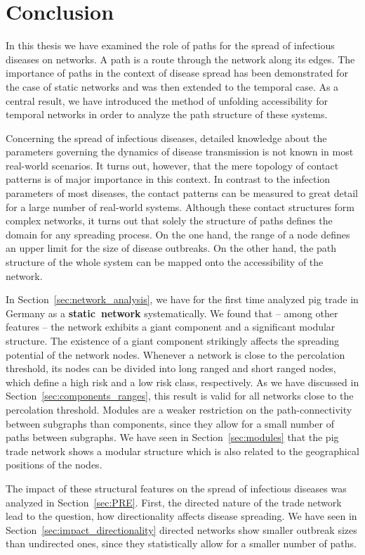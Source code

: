 \chapter{Conclusion}
In this thesis we have examined the role of paths for the spread of infectious diseases on networks.
A path is a route through the network along its edges.
The importance of paths in the context of disease spread has been demonstrated for the case of static networks and was then extended to the temporal case.
As a central result, we have introduced the method of unfolding accessibility for temporal networks in order to analyze the path structure of these systems.

Concerning the spread of infectious diseases, detailed knowledge about the parameters governing the dynamics of disease transmission is not known in most real-world scenarios.
It turns out, however, that the mere topology of contact patterns is of major importance in this context.
In contrast to the infection parameters of most diseases, the contact patterns can be measured to great detail for a large number of real-world systems.
Although these contact structures form complex networks, it turns out that solely the structure of paths defines the domain for any spreading process.
On the one hand, the range of a node defines an upper limit for the size of disease outbreaks.
On the other hand, the path structure of the whole system can be mapped onto the accessibility of the network.

In Section~\ref{sec:network_analysis}, we have for the first time analyzed pig trade in Germany as a \textbf{static~network} systematically.
We found that -- among other features -- the network exhibits a giant component and a significant modular structure.
The existence of a giant component strikingly affects the spreading potential of the network nodes.
Whenever a network is close to the percolation threshold, its nodes can be divided into long ranged and short ranged nodes, which define a high risk and a low risk class, respectively.
As we have discussed in Section~\ref{sec:components_ranges}, this result is valid for all networks close to the percolation threshold.
Modules are a weaker restriction on the path-connectivity between subgraphs than components, since they allow for a small number of paths between subgraphs.
We have seen in Section~\ref{sec:modules} that the pig trade network shows a modular structure which is also related to the geographical positions of the nodes.

The impact of these structural features on the spread of infectious diseases was analyzed in Section~\ref{sec:PRE}.
First, the directed nature of the trade network lead to the question, how directionality affects disease spreading.
We have seen in Section~\ref{sec:impact_directionality} directed networks show smaller outbreak sizes than undirected ones, since they statistically allow for a smaller number of paths.

